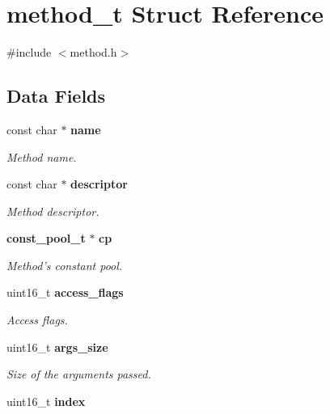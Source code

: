 \section{method\_\-t Struct Reference}
\label{structmethod__t}


{\ttfamily \#include $<$method.h$>$}

\subsection*{Data Fields}
\begin{DoxyCompactItemize}
\item 
const char $\ast$ {\bf name}\label{structmethod__t_accec03e70fcb79dc605c72db8c559a68}

\begin{DoxyCompactList}\small\item\em Method name. \item\end{DoxyCompactList}\item 
const char $\ast$ {\bf descriptor}\label{structmethod__t_abd4c8250246eb7db2d4fc0d7b133e4ee}

\begin{DoxyCompactList}\small\item\em Method descriptor. \item\end{DoxyCompactList}\item 
{\bf const\_\-pool\_\-t} $\ast$ {\bf cp}\label{structmethod__t_a041245b8c20e8bf05fc9fae9cedd2290}

\begin{DoxyCompactList}\small\item\em Method's constant pool. \item\end{DoxyCompactList}\item 
uint16\_\-t {\bf access\_\-flags}\label{structmethod__t_a25137490b9f611d35ff3280d94aa2d2d}

\begin{DoxyCompactList}\small\item\em Access flags. \item\end{DoxyCompactList}\item 
uint16\_\-t {\bf args\_\-size}\label{structmethod__t_aac20fc2168361d2f1e30959373200a27}

\begin{DoxyCompactList}\small\item\em Size of the arguments passed. \item\end{DoxyCompactList}\item 
uint16\_\-t {\bf index}\label{structmethod__t_aa5a72ec7b49050e28ea6d71a61931bd1}


\end{DoxyCompactItemize}
